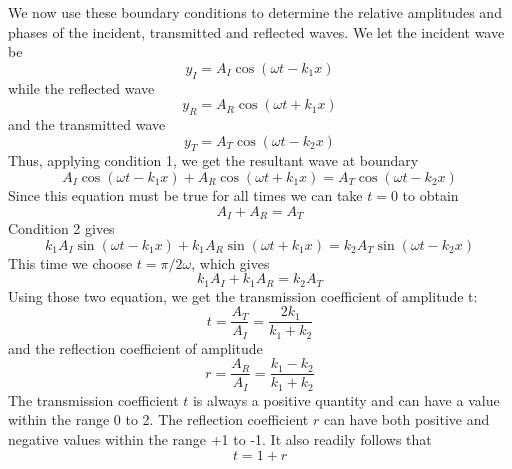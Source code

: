 \documentclass[../../../main.tex]{subfiles}
\begin{document}
We now use these boundary conditions to determine the relative amplitudes and phases of the incident, transmitted and reflected waves. We let the incident wave be
\begin{equation*}
    y_I = A_I \cos(\omega t - k_1x)
\end{equation*}
while the reflected wave
\begin{equation*}
    y_R = A_R \cos(\omega t + k_1x)
\end{equation*}
and the transmitted wave
\begin{equation*}
    y_T = A_T \cos(\omega t - k_2x)
\end{equation*}
Thus, applying condition 1, we get the resultant wave at boundary
\begin{equation*}
    A_I \cos(\omega t - k_1x)+ A_R \cos(\omega t + k_1x) =  A_T \cos(\omega t - k_2x)
\end{equation*}
Since this equation must be true for all times we can take $ t = 0$ to obtain
\begin{equation*}
    A_I+A_R=A_T
\end{equation*}
Condition 2 gives 
\begin{equation*}
    k_1A_I \sin(\omega t - k_1x)+ k_1A_R \sin(\omega t + k_1x) =  k_2A_T \sin(\omega t - k_2x)
\end{equation*}
This time we choose $t = \pi/2\omega$, which gives
\begin{equation*}
    k_1A_I + k_1A_R  =  k_2A_T  
\end{equation*}
Using those two equation, we get the transmission coefficient of amplitude t:
\begin{equation*}
    t=\frac{A_T}{A_I}=\frac{2k_1}{k_1+k_2}
\end{equation*}
and the reflection coefficient of amplitude
\begin{equation*}
    r=\frac{A_R}{A_I}=\frac{k_1-k_2}{k_1+k_2}
\end{equation*}
The transmission coefficient $t$ is always a positive quantity and can have a value within the range 0 to 2. The reflection coefficient $r$ can have both positive and negative values within the range +1 to -1. It also readily follows that
\begin{equation*}
    t=1+r
\end{equation*}
\end{document}
